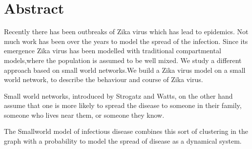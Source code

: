 
\chapter*{Abstract} 
Recently there has been outbreaks of Zika virus which has lead to epidemics. Not much work has been over the years to model the spread of the infection.
Since its emergence Zika virus has been modelled with traditional compartmental models,where the population is assumed to be well mixed.
We study a different approach based on small world networks.We build a Zika virus model on a small world network, to describe the behaviour and course of Zika virus.


Small world networks, introduced by Strogatz and Watts, on the other hand assume that one is more likely to spread the disease to someone in their family, someone who lives near them, or someone they know.

The Smallworld model of infectious disease combines this sort of clustering in the graph with a probability to model the spread of disease as a dynamical system.





